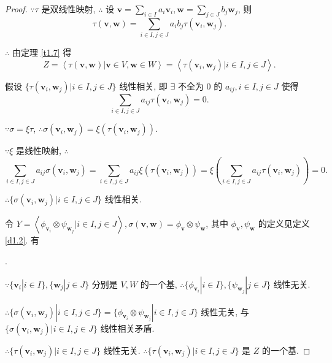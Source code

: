\documentclass{ctexart}
\begin{document}
\begin{proof}
    $\because\tau$ 是双线性映射, $\therefore$ 设 $\boldsymbol{v}=\sum\limits_{i\in I}a_i\boldsymbol{v}_i,\boldsymbol{w}=\sum\limits_{j\in J}b_j\boldsymbol{w}_j$, 则
    \[\tau(\boldsymbol{v},\boldsymbol{w})=\sum\limits_{i\in I,j\in J}a_ib_j\tau(\boldsymbol{v}_i,\boldsymbol{w}_j).\]
    
    $\therefore$ 由定理 \ref{t1.7} 得
    \[Z=\left<\tau(\boldsymbol{v},\boldsymbol{w})|\boldsymbol{v}\in V,\boldsymbol{w}\in W\right>=\left<\tau(\boldsymbol{v}_i,\boldsymbol{w}_j)|i\in I,j\in J\right>.\]

    假设 $\{\tau(\boldsymbol{v}_i,\boldsymbol{w}_j)|i\in I,j\in J\}$ 线性相关, 即 $\exists$ 不全为 $0$ 的 $a_{ij},i\in I,j\in J$ 使得
    \[\sum\limits_{i\in I,j\in J}a_{ij}\tau(\boldsymbol{v}_i,\boldsymbol{w}_j)=0.\]

    $\because\sigma=\xi\tau$, $\therefore\sigma(\boldsymbol{v}_i,\boldsymbol{w}_j)=\xi(\tau(\boldsymbol{v}_i,\boldsymbol{w}_j))$.

    $\because\xi$ 是线性映射, $\therefore$
    \[\sum\limits_{i\in I,j\in J}a_{ij}\sigma(\boldsymbol{v}_i,\boldsymbol{w}_j)=\sum\limits_{i\in I,j\in J}a_{ij}\xi(\tau(\boldsymbol{v}_i,\boldsymbol{w}_j))=\xi\left(\sum\limits_{i\in I,j\in J}a_{ij}\tau(\boldsymbol{v}_i,\boldsymbol{w}_j)\right)=0.\]

    $\therefore\{\sigma(\boldsymbol{v}_i,\boldsymbol{w}_j)|i\in I,j\in J\}$ 线性相关.
    
    令 $Y=\left<\phi_{\boldsymbol{v}_i}\otimes\psi_{\boldsymbol{w}_j}|i\in I,j\in J\right>,\sigma(\boldsymbol{v},\boldsymbol{w})=\phi_{\boldsymbol{v}}\otimes\psi_{\boldsymbol{w}}$, 其中 $\phi_{\boldsymbol{v}},\psi_{\boldsymbol{w}}$ 的定义见定义 \ref{d1.2}. 有
    \begin{center}
        .
    \end{center}

    $\because\{\boldsymbol{v}_i|i\in I\},\{\boldsymbol{w}_j|j\in J\}$ 分别是 $V,W$ 的一个基, $\therefore\{\phi_{\boldsymbol{v}_i}|i\in I\},\{\psi_{\boldsymbol{w}_j}|j\in J\}$ 线性无关.
    
    $\therefore\{\sigma(\boldsymbol{v}_i,\boldsymbol{w}_j)|i\in I,j\in J\}=\{\phi_{\boldsymbol{v}_i}\otimes\psi_{\boldsymbol{w}_j}|i\in I,j\in J\}$ 线性无关, 与 $\{\sigma(\boldsymbol{v}_i,\boldsymbol{w}_j)|i\in I,j\in J\}$ 线性相关矛盾.

    $\therefore\{\tau(\boldsymbol{v}_i,\boldsymbol{w}_j)|i\in I,j\in J\}$ 线性无关. $\therefore\{\tau(\boldsymbol{v}_i,\boldsymbol{w}_j)|i\in I,j\in J\}$ 是 $Z$ 的一个基.
\end{proof}
\end{document}
